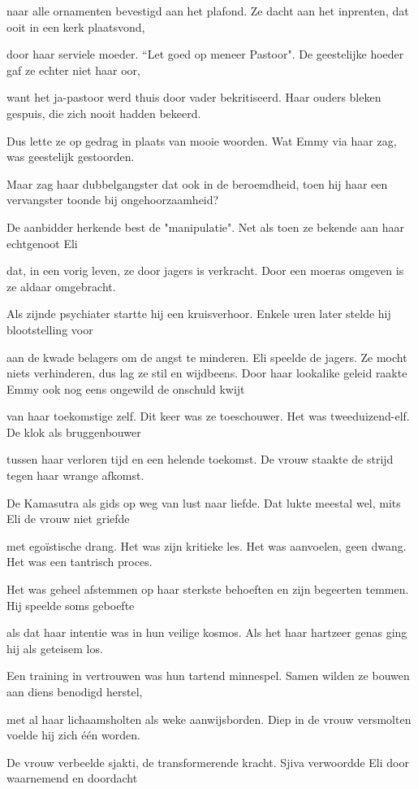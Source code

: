naar alle ornamenten
bevestigd aan het plafond.
Ze dacht aan het inprenten,
dat ooit in een kerk plaatsvond,

door haar serviele moeder.
“Let goed op meneer Pastoor".
De geestelijke hoeder
gaf ze echter niet haar oor,

want het ja-pastoor werd thuis
door vader bekritiseerd.
Haar ouders bleken gespuis,
die zich nooit hadden bekeerd.

Dus lette ze op gedrag
in plaats van mooie woorden.
Wat Emmy via haar zag,
was geestelijk gestoorden.

Maar zag haar dubbelgangster
dat ook in de beroemdheid,
toen hij haar een vervangster
toonde bij ongehoorzaamheid?

De aanbidder herkende
best de "manipulatie".
Net als toen ze bekende
aan haar echtgenoot Eli

dat, in een vorig leven,
ze door jagers is verkracht.
Door een moeras omgeven
is ze aldaar omgebracht.

Als zijnde psychiater
startte hij een kruisverhoor.
Enkele uren later
stelde hij blootstelling voor

aan de kwade belagers
om de angst te minderen.
Eli speelde de jagers.
Ze mocht niets verhinderen,
dus lag ze stil en wijdbeens.
Door haar lookalike geleid
raakte Emmy ook nog eens
ongewild de onschuld kwijt

van haar toekomstige zelf.
Dit keer was ze toeschouwer.
Het was tweeduizend-elf.
De klok als bruggenbouwer

tussen haar verloren tijd
en een helende toekomst.
De vrouw staakte de strijd
tegen haar wrange afkomst.

De Kamasutra als gids
op weg van lust naar liefde. Dat lukte meestal wel, mits
Eli de vrouw niet griefde

met egoïstische drang.
Het was zijn kritieke les.
Het was aanvoelen, geen dwang.
Het was een tantrisch proces.

Het was geheel afstemmen
op haar sterkste behoeften
en zijn begeerten temmen.
Hij speelde soms geboefte

als dat haar intentie was
in hun veilige kosmos.
Als het haar hartzeer genas
ging hij als geteisem los.

Een training in vertrouwen
was hun tartend minnespel.
Samen wilden ze bouwen
aan diens benodigd herstel,

met al haar lichaamsholten
als weke aanwijsborden.
Diep in de vrouw versmolten
voelde hij zich één worden.

De vrouw verbeelde sjakti,
de transformerende kracht.
Sjiva verwoordde Eli
door waarnemend en doordacht


